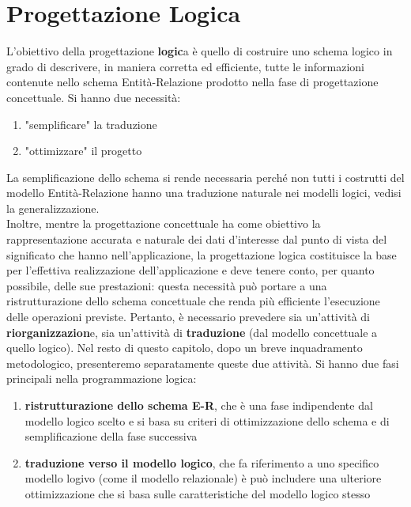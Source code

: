 \documentclass[a4paper,12pt, oneside]{book}
\begin{document}
\chapter{Progettazione Logica}
L'obiettivo della progettazione \textbf{logic}a è quello di costruire uno schema logico in
grado di descrivere, in maniera corretta ed efficiente, tutte le informazioni
contenute nello schema Entità-Relazione prodotto nella fase di progettazione concettuale. Si hanno due necessità:
\begin{enumerate}
\item "semplificare" la traduzione
\item "ottimizzare" il progetto
\end{enumerate}
La semplificazione dello schema si rende necessaria perché non tutti i costrutti
del modello Entità-Relazione hanno una traduzione naturale nei modelli logici,
vedisi la generalizzazione.\\
Inoltre, mentre la progettazione concettuale ha come obiettivo la rappresentazione
accurata e naturale dei dati d'interesse dal punto di vista del significato che hanno nell'applicazione,
la progettazione logica costituisce la base per l'effettiva realizzazione dell'applicazione
e deve tenere conto, per quanto possibile, delle sue
prestazioni: questa necessità può portare a una ristrutturazione dello schema concettuale
che renda più efficiente l'esecuzione delle operazioni previste.
Pertanto, è necessario prevedere sia un'attività di \textbf{riorganizzazion}e,
sia un'attività di \textbf{traduzione} (dal modello concettuale a quello logico). Nel resto di questo capitolo, dopo
un breve inquadramento metodologico, presenteremo separatamente queste due
attività.
\newpage
Si hanno due fasi principali nella programmazione logica:
\begin{enumerate}
\item \textbf{ristrutturazione dello schema E-R}, che è una fase indipendente dal
modello logico scelto e si basa su criteri di ottimizzazione dello schema e di
semplificazione della fase successiva
\item \textbf{traduzione verso il modello logico}, che fa riferimento a uno specifico modello logivo (come il modello relazionale) è può includere una ulteriore ottimizzazione che si basa sulle caratteristiche del modello logico stesso
\end{enumerate}
\end{document}
